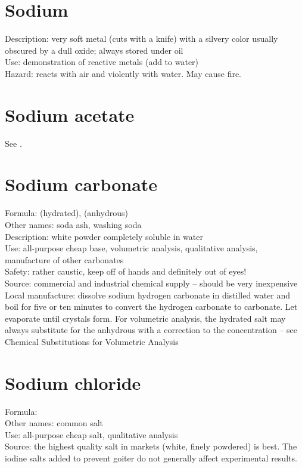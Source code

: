 \section{Sodium}
\label{sec:}
Description: very soft metal (cuts with a knife) 
with a silvery color usually obscured by a dull oxide; 
always stored under oil\\
Use: demonstration of reactive metals (add to water)\\
Hazard: reacts with air and violently with water. 
May cause fire.

\section{Sodium acetate}
\label{sec:}
See .

\section{Sodium carbonate}
\label{sec:}
Formula:  (hydrated), 
 (anhydrous)\\
Other names: soda ash, washing soda\\
Description: white powder completely soluble in water\\
Use: all-purpose cheap base, 
volumetric analysis, 
qualitative analysis, 
manufacture of other carbonates\\
Safety: rather caustic, keep off of hands and definitely out of eyes!\\
Source: commercial and industrial chemical supply -- 
should be very inexpensive\\
Local manufacture: dissolve sodium hydrogen carbonate in distilled water 
and boil for five or ten minutes 
to convert the hydrogen carbonate to carbonate. 
Let evaporate until crystals form. 
For volumetric analysis, 
the hydrated salt may always substitute 
for the anhydrous with a correction to the concentration -- 
see Chemical Substitutions for Volumetric Analysis

\section{Sodium chloride}
\label{sec:}
Formula: \\
Other names: common salt\\
Use: all-purpose cheap salt, 
qualitative analysis\\
Source: the highest quality salt in markets (white, 
finely powdered) is best. 
The iodine salts added to prevent goiter 
do not generally affect experimental results.

